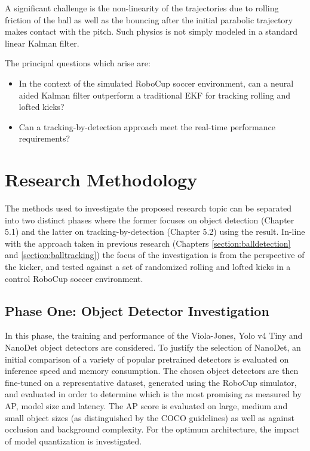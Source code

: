 \documentclass[a4paper,twoside,12pt]{report}
\begin{document}
A significant challenge is the non-linearity of the trajectories due to rolling friction of the ball as well as the bouncing after the initial parabolic trajectory makes contact with the pitch. Such physics is not simply modeled in a standard linear Kalman filter. 

The principal questions which arise are:
\begin{itemize}
    \item In the context of the simulated RoboCup soccer environment, can a neural aided Kalman filter outperform a traditional EKF for tracking rolling and lofted kicks?
	\item Can a tracking-by-detection approach meet the real-time performance requirements?
\end{itemize}

\chapter{Research Methodology}

The methods used to investigate the proposed research topic can be separated into two distinct phases where the former focuses on object detection (Chapter 5.1) and the latter on tracking-by-detection (Chapter 5.2) using the result. In-line with the approach taken in previous research (Chapters \ref{section:balldetection} and \ref{section:balltracking}) the focus of the investigation is from the perspective of the kicker, and tested against a set of randomized rolling and lofted kicks in a control RoboCup soccer environment. 

\section{Phase One: Object Detector Investigation}

In this phase, the training and performance of the Viola-Jones, Yolo v4 Tiny and NanoDet object detectors are considered. To justify the selection of NanoDet, an initial comparison of a variety of popular pretrained detectors is evaluated on inference speed and memory consumption. The chosen object detectors are then fine-tuned on a representative dataset, generated using the RoboCup simulator, and evaluated in order to determine which is the most promising as measured by AP, model size and latency. The AP score is evaluated on large, medium and small object sizes (as distinguished by the COCO guidelines) as well as against occlusion and background complexity. For the optimum architecture, the impact of model quantization is investigated.
\end{document}
